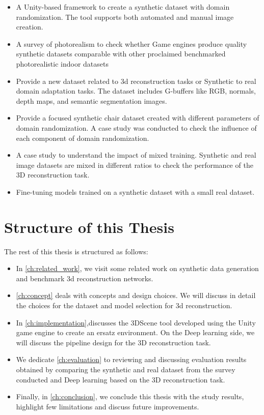 \begin{itemize}
    \item A Unity-based framework to create a synthetic dataset with domain randomization.
    The tool supports both automated and manual image creation.
    \item A survey of photorealism to check whether Game engines produce quality synthetic datasets comparable with other proclaimed benchmarked photorealistic indoor datasets
    \item Provide a new dataset related to 3d reconstruction tasks or Synthetic to real domain adaptation tasks.
    The dataset includes G-buffers like RGB, normals, depth maps, and semantic segmentation images.
    \item Provide a focused synthetic chair dataset created with different parameters of domain randomization.
    A case study was conducted to check the influence of each component of domain randomization.
    \item A case study to understand the impact of mixed training.
    Synthetic and real image datasets are mixed in different ratios to check the performance of the 3D reconstruction task.
    \item Fine-tuning models trained on a synthetic dataset with a small real dataset.
\end{itemize}


\section{Structure of this Thesis}\label{sec:Structure of thesis}

The rest of this thesis is structured as follows:

\begin{itemize}
    \item In \autoref{ch:related_work}, we visit some related work on synthetic data generation and benchmark 3d reconstruction networks.
    \item \autoref{ch:concept} deals with concepts and design choices.
    We will discuss in detail the choices for the dataset and model selection for 3d reconstruction.
    \item In \autoref{ch:implementation},discusses the 3DScene tool developed using the Unity game engine to create an ersatz environment.
    On the Deep learning side, we will discuss the pipeline design for the 3D reconstruction task.
    \item We dedicate \autoref{ch:evaluation} to reviewing and discussing evaluation results obtained by comparing the synthetic and real dataset from the survey conducted and Deep learning based on the 3D reconstruction task.
    \item Finally, in \autoref{ch:conclusion}, we conclude this thesis with the study results, highlight few limitations and discuss future improvements.
\end{itemize}